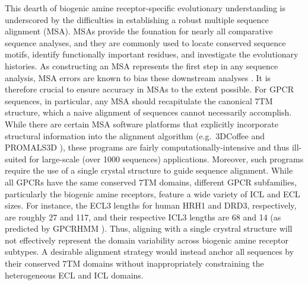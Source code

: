 \documentclass[fleqn,10pt]{wlpeerj}
\begin{document}
This dearth of biogenic amine receptor-specific evolutionary understanding is underscored by the difficulties in establishing a robust multiple sequence alignment (MSA). MSAs provide the founation for nearly all comparative sequence analyses, and they are commonly used to locate conserved sequence motifs, identify functionally important residues, and investigate the evolutionary histories. As constructing an MSA represents the first step in any sequence analysis, MSA errors are known to bias these downstream analyses \citep{Ogden2006, Wong2008, Jordan2012}. It is therefore crucial to ensure accuracy in MSAs to the extent possible. For GPCR sequences, in particular, any MSA should recapitulate the canonical 7TM structure, which a naive alignment of sequences cannot necessarily accomplish. While there are certain MSA software platforms that explicitly incorporate structural information into the alignment algorithm (e.g.\ 3DCoffee \citep{3dcoffee} and PROMALS3D \citep{promals3d}), these programs are fairly computationally-intensive and thus ill-suited for large-scale (over 1000 sequences) applications. Moreover, such programs require the use of a single crystal structure to guide sequence alignment. While all GPCRs have the same conserved 7TM domains, different GPCR subfamilies, particularly the biogenic amine receptors, feature a wide variety of ICL and ECL sizes. For instance, the ECL3 lengths for human HRH1 and DRD3, respectively, are roughly 27 and 117, and their respective ICL3 lengths are 68 and 14 (as predicted by GPCRHMM \citep{Wistrand2006}). Thus, aligning with a single crystral structure will not effectively represent the domain variability across biogenic amine receptor subtypes. A desirable alignment strategy would instead anchor all sequences by their conserved 7TM domains without inappropriately constraining the heterogeneous ECL and ICL domains.
\end{document}
